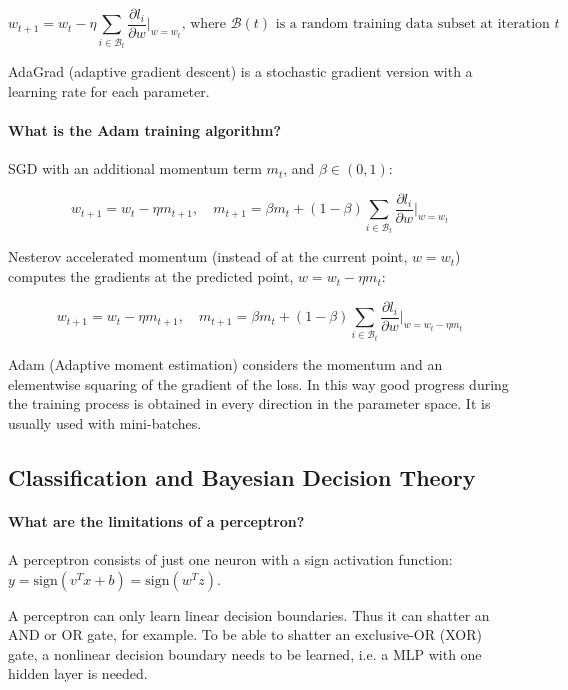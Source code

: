 $$
w_{t+1} = w_t - \eta \sum_{i \in \mathcal{B}_t}{\frac{\partial l_i}{\partial w}} \Big\rvert_{w = w_t},
\, \text{where } \mathcal{B}(t) \text{ is a random training data subset at iteration } t
$$

AdaGrad (adaptive gradient descent) is a stochastic gradient version with
a learning rate for each parameter.

\paragraph{What is the Adam training algorithm?}

SGD with an additional momentum term $m_t$, and $\beta \in (0, 1)$:

$$
w_{t+1} = w_t - \eta m_{t+1}, \quad
m_{t+1} = \beta m_t + (1 - \beta) \sum_{i \in \mathcal{B}_t}{\frac{\partial l_i}{\partial w}} \Big\rvert_{w = w_t}
$$

Nesterov accelerated momentum
(instead of at the current point, $w = w_t$)
computes the gradients at the predicted point, $w = w_t - \eta m_t$:

$$
w_{t+1} = w_t - \eta m_{t+1}, \quad
m_{t+1} = \beta m_t + (1 - \beta) \sum_{i \in \mathcal{B}_t}{\frac{\partial l_i}{\partial w}} \Big\rvert_{w = w_t - \eta m_t}
$$

Adam (Adaptive moment estimation) considers the momentum and
an elementwise squaring of the gradient of the loss.
In this way good progress during the training process is obtained in every
direction in the parameter space. It is usually used with mini-batches.


\newpage
\subsection{Classification and Bayesian Decision Theory}

\paragraph{What are the limitations of a perceptron?}

A perceptron consists of just one neuron with a sign activation function:
$y = \text{sign}(v^T x + b) = \text{sign}(w^T z)$.

A perceptron can only learn linear decision boundaries.
Thus it can shatter an AND or OR gate, for example.
To be able to shatter an exclusive-OR (XOR) gate,
a nonlinear decision boundary needs to be learned,
i.e. a MLP with one hidden layer is needed.

